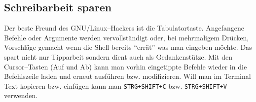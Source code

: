 \subsection{Schreibarbeit sparen}
Der beste Freund des GNU/Linux--Hackers ist die Tabulatortaste. Angefangene Befehle oder Argumente werden vervollständigt oder, bei mehrmaligem Drücken, Vorschläge gemacht wenn die Shell bereits ``errät'' was man eingeben möchte. Das spart nicht nur Tipparbeit sondern dient auch als Gedankenstütze. Mit den Cursor--Tasten (Auf und Ab) kann man vorhin eingetippte Befehle wieder in die Befehlszeile laden und erneut ausführen bzw. modifizieren. Will man im Terminal Text kopieren bzw. einfügen kann man \lstinline|STRG+SHIFT+C| bzw. \lstinline|STRG+SHIFT+V| verwenden.